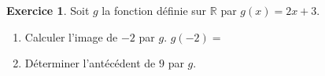 \documentclass[12pt]{exam}
\theoremstyle{definition}
\newtheorem{exercice}{Exercice}
\newcommand{\pt}[1][2.5cm]{\makebox[#1]{\dotfill}}
\begin{document}
\vfill
\begin{exercice}
Soit $g$ la fonction définie sur $\mathbb{R}$ par $g(x) = 2x+3$.
\begin{enumerate}[label=\arabic*., itemsep=1.2em, topsep=0.6em]
\item Calculer l'image de $-2$ par $g$. \hfill $g(-2)=$ \pt[4cm] \hspace*{1cm}
\item Déterminer l'antécédent de $9$ par $g$.

\end{enumerate}
\end{exercice}

\vfill
\end{document}
